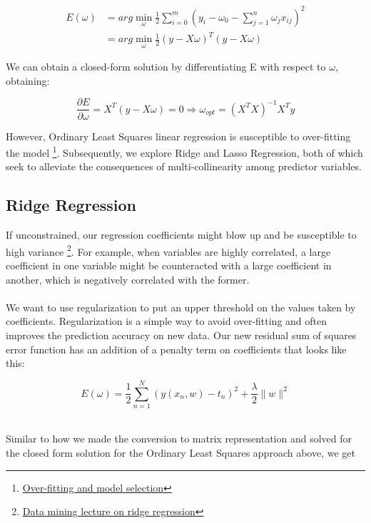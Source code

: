 \documentclass[letterpaper]{article}
\begin{document}
\begin{equation}
\begin{split}
E(\omega) &= arg \min_{\omega} \frac{1}{2} \sum_{i=0}^m \left( y_i - \omega_0 - \sum_{j=1}^{n} \omega_j x_{ij} \right)^2 \\
&= arg \min_{\omega} \frac{1}{2} (y - X\omega)^{T} (y - X\omega)
\end{split}
\end{equation}

\noindent We can obtain a closed-form solution by differentiating E with respect to $\omega$, obtaining:

$$\frac{\partial E}{\partial \omega} = X^{T}(y-X\omega) = 0 \Rightarrow \omega_{opt} = (X^{T}X)^{-1} X^{T}y$$

\noindent However, Ordinary Least Squares linear regression is susceptible to over-fitting the model \footnote{\href{http://www.jdl.ac.cn/user/hchang/course_staffs/02_overfitting\%20and\%20model\%20selection.pdf}{Over-fitting and model selection}}. Subsequently, we explore Ridge and Lasso Regression, both of which seek to alleviate the consequences of multi-collinearity among predictor variables. 


\subsection{Ridge Regression}
If unconstrained, our regression coefficients might blow up and be susceptible to high variance \footnote{\href{http://www.stat.cmu.edu/~ryantibs/datamining/lectures/16-modr1.pdf}{Data mining lecture on ridge regression}}. For example, when variables are highly correlated, a large coefficient in one variable might be counteracted with a large coefficient in another, which is negatively correlated with the former.\\ 
\\
\noindent We want to use regularization to put an upper threshold on the values taken by coefficients. Regularization is a simple way to avoid over-fitting and often improves the prediction accuracy on new data. Our new residual sum of squares error function has an addition of a penalty term on coefficients that looks like this:

$$E(\omega) = \frac{1}{2} \sum_{n=1}^N (y(x_n,w) - t_n)^2 + \frac{\lambda}{2} \lVert w \rVert ^2$$

\\
Similar to how we made the conversion to matrix representation and solved for the closed form solution for the Ordinary Least Squares approach above, we get
\end{document}
